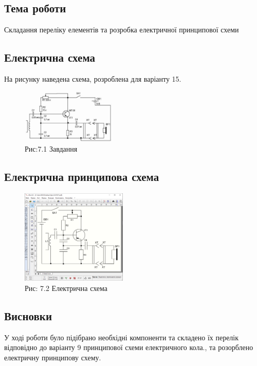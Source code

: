 \documentclass[a4paper]{article}
\begin{document}
\subsection*{Тема роботи}
Складання переліку елементів 
    та розробка електричної 
    принципової схеми
\subsection*{Електрична схема}
На рисунку наведена схема, розроблена для варіанту 15.

\begin{figure}[h]
    \centering
    \includegraphics[width=0.4\textwidth]{imgs/PW7.1.png}
    \caption*{Рис:7.1 Завдання}
\end{figure}

\subsection*{Електрична принципова схема}
\begin{figure}[h]
    \centering
    \includegraphics[width=0.45\textwidth]{imgs/PW7.2.png}
    \caption*{Рис: 7.2 Електрична схема}
\end{figure}

\subsection*{Висновки}
У ході роботи було підібрано необхідні компоненти та складено їх перелік відповідно до варіанту 9 принципової схеми електричного кола., та розорблено електричну принципову схему.
\end{document}
